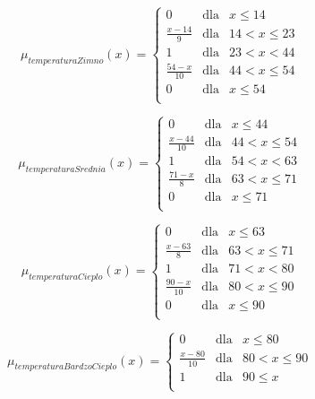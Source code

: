 \documentclass{classrep}
\begin{document}
\begin{equation}
\mu _{temperaturaZimno}(x) =  \left\{ \begin{array}{rcl}
 0 & \mbox{dla} & x  \leq 14 \\
\frac{x - 14}{9} & \mbox{dla} & 14 < x \leq 23\\
1 & \mbox{dla} & 23 < x < 44\\
\frac{54 - x}{10} & \mbox{dla} & 44 < x \leq 54\\
 0 & \mbox{dla} & x  \leq 54 \\
\end{array}\right.
\end{equation}

\begin{equation}
\mu _{temperaturaSrednia}(x) =  \left\{ \begin{array}{rcl}
 0 & \mbox{dla} & x  \leq 44 \\
\frac{x - 44}{10} & \mbox{dla} & 44 < x \leq 54\\
1 & \mbox{dla} & 54 < x < 63\\
\frac{71 - x}{8} & \mbox{dla} & 63 < x \leq 71\\
 0 & \mbox{dla} & x  \leq 71 \\
\end{array}\right.
\end{equation}

\begin{equation}
\mu _{temperaturaCieplo}(x) =  \left\{ \begin{array}{rcl}
 0 & \mbox{dla} & x  \leq 63 \\
\frac{x - 63}{8} & \mbox{dla} & 63 < x \leq 71\\
1 & \mbox{dla} & 71 < x < 80\\
\frac{90 - x}{10} & \mbox{dla} & 80 < x \leq 90\\
 0 & \mbox{dla} & x  \leq 90 \\
\end{array}\right.
\end{equation}

\begin{equation}
\mu _{temperaturaBardzoCieplo}(x) =  \left\{ \begin{array}{rcl}
 0 & \mbox{dla} & x \leq 80 \\
\frac{x - 80}{10} & \mbox{dla} & 80 < x \leq 90\\
1 & \mbox{dla} & 90 \leq x\\
\end{array}\right.
\end{equation}
\end{document}
